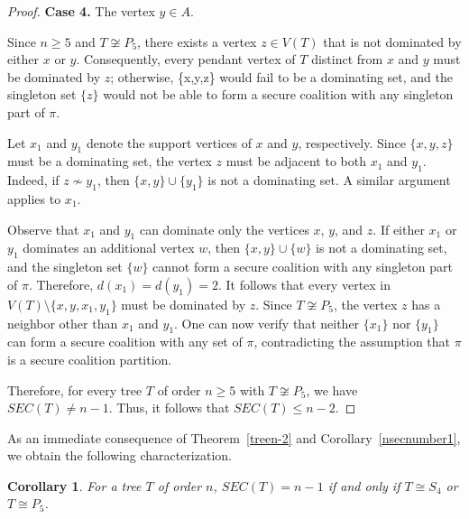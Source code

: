 \documentclass[12pt]{article}
\newtheorem{corollary}[theorem]{Corollary}
\begin{document}
\begin{proof}
\textbf{Case 4.} The vertex $y\in A$.

Since $n\ge 5$ and $T\not\cong P_5$, there exists a vertex $z\in V(T)$ that is not dominated by either $x$ or $y$. Consequently, every pendant vertex of $T$ distinct from $x$ and $y$ must be dominated by $z$; otherwise, \{x,y,z\} would fail to be a dominating set, and the singleton set $\{z\}$ would not be able to form a secure coalition with any singleton part of $\pi$.

Let $x_1$ and $y_1$ denote the support vertices of $x$ and $y$, respectively. Since $\{x,y,z\}$ must be a dominating set, the vertex $z$ must be adjacent to both $x_1$ and $y_1$. Indeed, if $z\not\sim y_1$, then $\{x,y\}\cup\{y_1\}$ is not a dominating set. A similar argument applies to $x_1$.

Observe that $x_1$ and $y_1$ can dominate only the vertices $x$, $y$, and $z$. If either $x_1$ or $y_1$ dominates an additional vertex $w$, then $\{x,y\}\cup\{w\}$ is not a dominating set, and the singleton set $\{w\}$ cannot form a secure coalition with any singleton part of $\pi$. Therefore, $d(x_1)=d(y_1)=2$. It follows that every vertex in $V(T)\setminus\{x,y,x_1,y_1\}$
must be dominated by $z$. Since $T\not\cong P_5$, the vertex $z$ has a neighbor other than $x_1$ and $y_1$. One can now verify that neither $\{x_1\}$ nor $\{y_1\}$ can form a secure coalition with any set of $\pi$, contradicting the assumption that $\pi$ is a secure coalition partition.

Therefore, for every tree $T$ of order $n\ge 5$ with $T\not\cong P_5$, we have $SEC(T)\neq n-1$. Thus, it follows that
$SEC(T)\le n-2$.
\end{proof}
As an immediate consequence of Theorem~\ref{treen-2} and Corollary~\ref{nsecnumber1}, we obtain the following characterization.

\begin{corollary}
For a tree $T$ of order $n$,
$SEC(T)=n-1$ if and only if $T\cong S_4$ or $T\cong P_5$.
\end{corollary}
\end{document}
